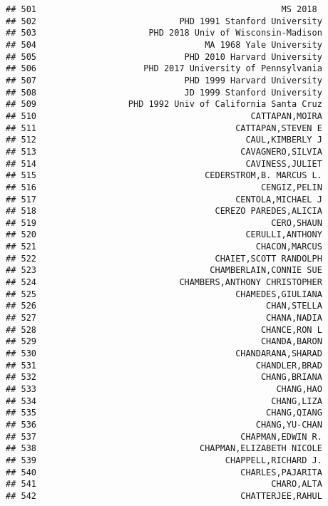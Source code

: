 \documentclass[
]{article}
\begin{document}
\begin{verbatim}
## 501                                                MS 2018 
## 502                            PHD 1991 Stanford University
## 503                      PHD 2018 Univ of Wisconsin-Madison
## 504                                 MA 1968 Yale University
## 505                             PHD 2010 Harvard University
## 506                     PHD 2017 University of Pennsylvania
## 507                             PHD 1999 Harvard University
## 508                             JD 1999 Stanford University
## 509                  PHD 1992 Univ of California Santa Cruz
## 510                                          CATTAPAN,MOIRA
## 511                                       CATTAPAN,STEVEN E
## 512                                         CAUL,KIMBERLY J
## 513                                        CAVAGNERO,SILVIA
## 514                                         CAVINESS,JULIET
## 515                                 CEDERSTROM,B. MARCUS L.
## 516                                            CENGIZ,PELIN
## 517                                       CENTOLA,MICHAEL J
## 518                                   CEREZO PAREDES,ALICIA
## 519                                              CERO,SHAUN
## 520                                         CERULLI,ANTHONY
## 521                                           CHACON,MARCUS
## 522                                   CHAIET,SCOTT RANDOLPH
## 523                                  CHAMBERLAIN,CONNIE SUE
## 524                            CHAMBERS,ANTHONY CHRISTOPHER
## 525                                       CHAMEDES,GIULIANA
## 526                                             CHAN,STELLA
## 527                                             CHANA,NADIA
## 528                                            CHANCE,RON L
## 529                                            CHANDA,BARON
## 530                                       CHANDARANA,SHARAD
## 531                                           CHANDLER,BRAD
## 532                                            CHANG,BRIANA
## 533                                               CHANG,HAO
## 534                                              CHANG,LIZA
## 535                                             CHANG,QIANG
## 536                                           CHANG,YU-CHAN
## 537                                        CHAPMAN,EDWIN R.
## 538                                CHAPMAN,ELIZABETH NICOLE
## 539                                     CHAPPELL,RICHARD J.
## 540                                        CHARLES,PAJARITA
## 541                                              CHARO,ALTA
## 542                                        CHATTERJEE,RAHUL

\end{verbatim}
\end{document}
